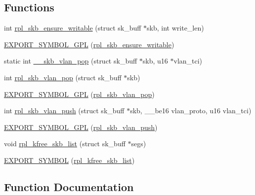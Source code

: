 \subsection*{Functions}
\begin{DoxyCompactItemize}
\item 
int \hyperlink{skbuff-openvswitch_8c_a15c9dad54898a1483b0c61101836ae4b}{rpl\+\_\+skb\+\_\+ensure\+\_\+writable} (struct sk\+\_\+buff $\ast$skb, int write\+\_\+len)
\item 
\hyperlink{skbuff-openvswitch_8c_a7ff7437b21b29dfb4e9dc4c4a2c1a5ea}{E\+X\+P\+O\+R\+T\+\_\+\+S\+Y\+M\+B\+O\+L\+\_\+\+G\+P\+L} (\hyperlink{skbuff-openvswitch_8c_a15c9dad54898a1483b0c61101836ae4b}{rpl\+\_\+skb\+\_\+ensure\+\_\+writable})
\item 
static int \hyperlink{skbuff-openvswitch_8c_a0f57a812e220d03f4a3a57604edfd079}{\+\_\+\+\_\+skb\+\_\+vlan\+\_\+pop} (struct sk\+\_\+buff $\ast$skb, u16 $\ast$vlan\+\_\+tci)
\item 
int \hyperlink{skbuff-openvswitch_8c_a797322c61b7d5999237ffdd59972751e}{rpl\+\_\+skb\+\_\+vlan\+\_\+pop} (struct sk\+\_\+buff $\ast$skb)
\item 
\hyperlink{skbuff-openvswitch_8c_aa16324b61c50ddbb2615a482ccd2cfc8}{E\+X\+P\+O\+R\+T\+\_\+\+S\+Y\+M\+B\+O\+L\+\_\+\+G\+P\+L} (\hyperlink{skbuff-openvswitch_8c_a797322c61b7d5999237ffdd59972751e}{rpl\+\_\+skb\+\_\+vlan\+\_\+pop})
\item 
int \hyperlink{skbuff-openvswitch_8c_ad4f8c18bdd22cdd3623de896458c404e}{rpl\+\_\+skb\+\_\+vlan\+\_\+push} (struct sk\+\_\+buff $\ast$skb, \+\_\+\+\_\+be16 vlan\+\_\+proto, u16 vlan\+\_\+tci)
\item 
\hyperlink{skbuff-openvswitch_8c_a0139a89a512cfd5b8aa405c2d49f0e85}{E\+X\+P\+O\+R\+T\+\_\+\+S\+Y\+M\+B\+O\+L\+\_\+\+G\+P\+L} (\hyperlink{skbuff-openvswitch_8c_ad4f8c18bdd22cdd3623de896458c404e}{rpl\+\_\+skb\+\_\+vlan\+\_\+push})
\item 
void \hyperlink{skbuff-openvswitch_8c_a23942601601684adfd86854f195244f3}{rpl\+\_\+kfree\+\_\+skb\+\_\+list} (struct sk\+\_\+buff $\ast$segs)
\item 
\hyperlink{skbuff-openvswitch_8c_ac2d4948230ea7306d2789e0e783241e7}{E\+X\+P\+O\+R\+T\+\_\+\+S\+Y\+M\+B\+O\+L} (\hyperlink{skbuff-openvswitch_8c_a23942601601684adfd86854f195244f3}{rpl\+\_\+kfree\+\_\+skb\+\_\+list})
\end{DoxyCompactItemize}


\subsection{Function Documentation}
\hypertarget{skbuff-openvswitch_8c_a0f57a812e220d03f4a3a57604edfd079}{}
